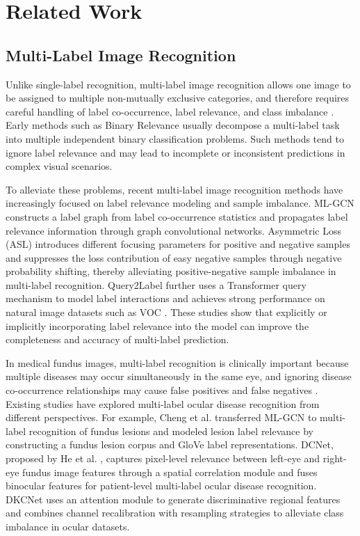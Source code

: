 
\section{Related Work}

\subsection{Multi-Label Image Recognition}

Unlike single-label recognition, multi-label image recognition allows one image to be assigned to multiple non-mutually exclusive categories, and therefore requires careful handling of label co-occurrence, label relevance, and class imbalance \cite{_Ref213949872}. Early methods such as Binary Relevance \cite{_Ref213949896} usually decompose a multi-label task into multiple independent binary classification problems. Such methods tend to ignore label relevance and may lead to incomplete or inconsistent predictions in complex visual scenarios.

To alleviate these problems, recent multi-label image recognition methods have increasingly focused on label relevance modeling and sample imbalance. ML-GCN \cite{_Ref213949382} constructs a label graph from label co-occurrence statistics and propagates label relevance information through graph convolutional networks. Asymmetric Loss (ASL) \cite{_Ref213949927} introduces different focusing parameters for positive and negative samples and suppresses the loss contribution of easy negative samples through negative probability shifting, thereby alleviating positive-negative sample imbalance in multi-label recognition. Query2Label \cite{_Ref213950246} further uses a Transformer query mechanism to model label interactions and achieves strong performance on natural image datasets such as VOC \cite{_Ref213950282}. These studies show that explicitly or implicitly incorporating label relevance into the model can improve the completeness and accuracy of multi-label prediction.

In medical fundus images, multi-label recognition is clinically important because multiple diseases may occur simultaneously in the same eye, and ignoring disease co-occurrence relationships may cause false positives and false negatives \cite{_Ref213949362}. Existing studies have explored multi-label ocular disease recognition from different perspectives. For example, Cheng et al. \cite{_Ref213950349} transferred ML-GCN to multi-label recognition of fundus lesions and modeled lesion label relevance by constructing a fundus lesion corpus and GloVe label representations. DCNet, proposed by He et al. \cite{_Ref213950338}, captures pixel-level relevance between left-eye and right-eye fundus image features through a spatial correlation module and fuses binocular features for patient-level multi-label ocular disease recognition. DKCNet \cite{_Ref213950343} uses an attention module to generate discriminative regional features and combines channel recalibration with resampling strategies to alleviate class imbalance in ocular datasets.

